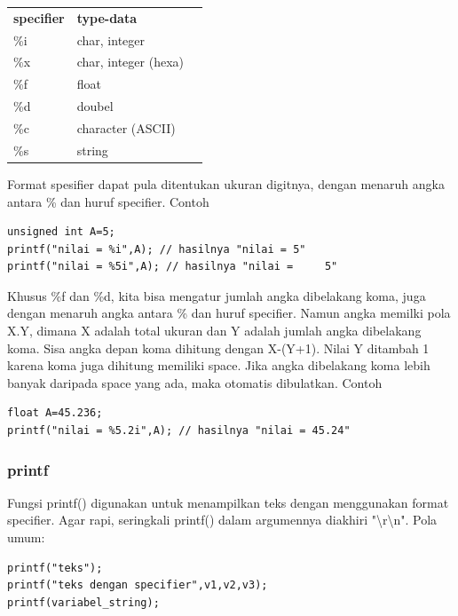 \documentclass[12pt,]{article}
\begin{document}
	\begin{table}[H]
		\begin{tabular}{|l|l|l}
			\cline{1-2}
			\textbf{specifier} & \textbf{type-data} \\ \cline{1-2}
			\%i & char, integer \\ \cline{1-2}
			\%x & char, integer (hexa) \\ \cline{1-2}
			\%f & float \\ \cline{1-2}
			\%d & doubel \\ \cline{1-2}
			\%c & character (ASCII) \\ \cline{1-2}
			\%s & string \\ \cline{1-2}
		\end{tabular}
	\end{table}

	Format spesifier dapat pula ditentukan ukuran digitnya, dengan menaruh angka antara \% dan huruf specifier.
	Contoh
	\begin{verbatim}
unsigned int A=5;
printf("nilai = %i",A); // hasilnya "nilai = 5"
printf("nilai = %5i",A); // hasilnya "nilai =     5"
	\end{verbatim}

	Khusus \%f dan \%d, kita bisa mengatur jumlah angka dibelakang koma, juga dengan menaruh angka antara \% dan huruf specifier.
	Namun angka memilki pola X.Y, dimana X adalah total ukuran dan Y adalah jumlah angka dibelakang koma.
	Sisa angka depan koma dihitung dengan X-(Y+1).
	Nilai Y ditambah 1 karena koma juga dihitung memiliki space.
	Jika angka dibelakang koma lebih banyak daripada space yang ada, maka otomatis dibulatkan.
	Contoh
	\begin{verbatim}
float A=45.236;
printf("nilai = %5.2i",A); // hasilnya "nilai = 45.24"
	\end{verbatim}

	\subsubsection{printf}

	Fungsi printf() digunakan untuk menampilkan teks dengan menggunakan format specifier.
	Agar rapi, seringkali printf() dalam argumennya diakhiri "\textbackslash r\textbackslash n".
	Pola umum:
	\begin{verbatim}
printf("teks");
printf("teks dengan specifier",v1,v2,v3);
printf(variabel_string);
	\end{verbatim}
\end{document}
